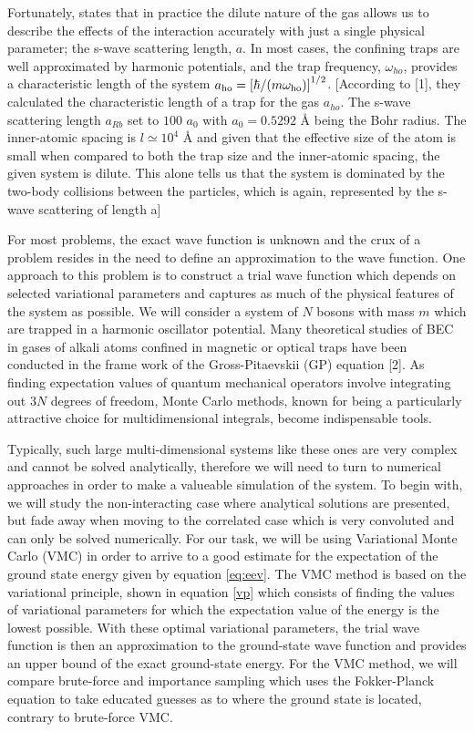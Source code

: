 Fortunately, \citeyearpar{Dalfovo1999} states that in practice the dilute nature of the gas allows us to describe the effects of the interaction accurately with just a single physical parameter; the s-wave scattering length, $a$. In most cases, the confining traps are well approximated by harmonic potentials, and the trap frequency, $\omega_{ho}$, provides a characteristic length of the system  $a_\mathrm{ho} = \qty[\hbar / \qty(m \omega_\mathrm{ho})]^{1/2}$. [According to [1], they calculated the characteristic length of a trap for the  gas $a_{ho}$. The s-wave scattering length $a_{Rb}$ set to $100$ $a_0$ with $a_0 = 0.5292 \text{ \AA}$ being the Bohr radius. The inner-atomic spacing is $l \simeq 10^4 \text{ \AA}$ and given that the effective size of the atom is small when compared to both the trap size and the inner-atomic spacing, the given system is dilute. This alone tells us that the system is dominated by the two-body collisions between the particles, which is again, represented by the s-wave scattering of length a]

For most problems, the exact wave function is unknown and the crux of a problem resides in the need to define an approximation to the wave function. One approach to this problem is to construct a trial wave function which depends on selected variational parameters and captures as much of the physical features of the system as possible. We will consider a system of $N$ bosons with mass $m$ which are trapped in a harmonic oscillator potential. Many theoretical studies of BEC in gases of alkali atoms confined in magnetic or optical traps have been conducted in the frame work of the Gross-Pitaevskii (GP) equation [2]. As finding expectation values of quantum mechanical operators involve integrating out $3N$ degrees of freedom, Monte Carlo methods, known for being a particularly attractive choice for multidimensional integrals, become indispensable tools.

Typically, such large multi-dimensional systems like these ones are very complex and cannot be solved analytically, therefore we will need to turn to numerical approaches in order to make a valueable simulation of the system. To begin with, we will study the non-interacting case where analytical solutions are presented, but fade away when moving to the correlated case which is very convoluted and can only be solved numerically. For our task, we will be using Variational Monte Carlo (VMC) in order to arrive to a good estimate for the expectation of the ground state energy given by equation \ref{eq:eev}. The VMC method is based on the variational principle, shown in equation \ref{vp} which consists of finding the values of variational parameters for which the expectation value of the energy is the lowest possible. With these optimal variational parameters, the trial wave function is then an approximation to the ground-state wave function and provides an upper bound of the exact ground-state energy. For the VMC method, we will compare brute-force and importance sampling which uses the Fokker-Planck equation to take educated guesses as to where the ground state is located, contrary to brute-force VMC. 

